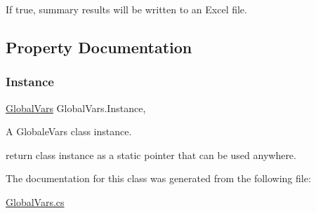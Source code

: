 If true, summary results will be written to an Excel file. 



\subsection{Property Documentation}
\mbox{\label{class_global_vars_ab848514ffc2a60c2c1642ff113f4293d}} 
\subsubsection{\texorpdfstring{Instance}{Instance}}
{\footnotesize\ttfamily \mbox{\hyperlink{class_global_vars}{Global\+Vars}} Global\+Vars.\+Instance\hspace{0.3cm}{\ttfamily [static]}, {\ttfamily [get]}}



A Globale\+Vars class instance. 

return class instance as a static pointer that can be used anywhere. 

The documentation for this class was generated from the following file\+:\begin{DoxyCompactItemize}
\item 
\mbox{\hyperlink{_global_vars_8cs}{Global\+Vars.\+cs}}\end{DoxyCompactItemize}
